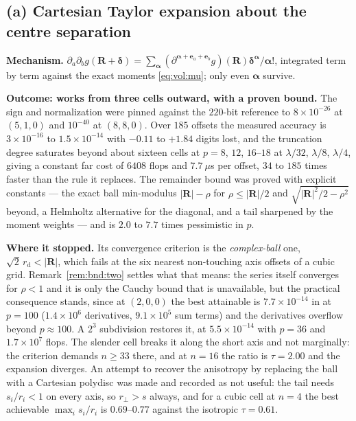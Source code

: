\subsection{(a) Cartesian Taylor expansion about the centre separation}
\label{sec:reg:a}

\textbf{Mechanism.} $\partial_a\partial_b g(\mathbf{R}+\boldsymbol{\delta}) =
\sum_{\boldsymbol{\alpha}}(\partial^{\boldsymbol{\alpha}+\mathbf{e}_a+\mathbf{e}_b}
g)(\mathbf{R})\boldsymbol{\delta}^{\boldsymbol{\alpha}}/\boldsymbol{\alpha}!$, integrated
term by term against the exact moments \eqref{eq:vol:mu}; only even
$\boldsymbol{\alpha}$ survive.

\textbf{Outcome: works from three cells outward, with a proven bound.} The sign and
normalization were pinned against the $220$-bit reference to $8\times10^{-26}$ at
$(5,1,0)$ and $10^{-40}$ at $(8,8,0)$. Over $185$ offsets the measured accuracy is
$3\times10^{-16}$ to $1.5\times10^{-14}$ with $-0.11$ to $+1.84$ digits lost, and the
truncation degree saturates beyond about sixteen cells at $p = 8$, $12$, $16$--$18$ at
$\lambda/32$, $\lambda/8$, $\lambda/4$, giving a constant far cost of $6408$ flops and
$7.7~\mu$s per offset, $34$ to $185$ times faster than the rule it replaces. The
remainder bound was proved with explicit constants --- the exact ball min-modulus
$|\mathbf{R}|-\rho$ for $\rho \le |\mathbf{R}|/2$ and
$\sqrt{|\mathbf{R}|^2/2-\rho^2}$ beyond, a Helmholtz alternative for the diagonal, and a
tail sharpened by the moment weights --- and is $2.0$ to $7.7$ times pessimistic in $p$.

\textbf{Where it stopped.} Its convergence criterion is the \emph{complex-ball} one,
$\sqrt{2}\,r_{\mathrm{d}} < |\mathbf{R}|$, which fails at the six nearest non-touching
axis offsets of a cubic grid. Remark~\ref{rem:bnd:two} settles what that means: the series
itself converges for $\rho < 1$ and it is only the Cauchy bound that is unavailable, but
the practical consequence stands, since at $(2,0,0)$ the best attainable is
$7.7\times10^{-14}$ in  at $p = 100$ ($1.4\times10^{6}$ derivatives,
$9.1\times10^{5}$ sum terms) and the derivatives overflow beyond $p \approx 100$. A
$2^3$ subdivision restores it, at $5.5\times10^{-14}$ with $p = 36$ and
$1.7\times10^{7}$ flops. The slender cell breaks it along the short axis and not
marginally: the criterion demands $n \ge 33$ there, and at $n = 16$ the ratio is
$\tau = 2.00$ and the expansion diverges. An attempt to recover the anisotropy by
replacing the ball with a Cartesian polydisc was made and recorded as not useful: the tail
needs $s_i/r_i < 1$ on every axis, so $r_\perp > s$ always, and for a cubic cell at
$n = 4$ the best achievable $\max_i s_i/r_i$ is $0.69$--$0.77$ against the isotropic
$\tau = 0.61$.

